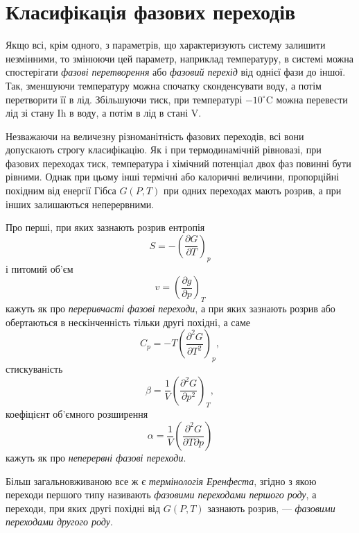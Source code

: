 \section{Класифікація фазових переходів}


Якщо всі, крім одного, з параметрів, що характеризують систему залишити незмінними, то
змінюючи цей параметр, наприклад температуру, в системі можна спостерігати \emph{фазові перетворення}
або \emph{фазовий перехід} від однієї фази до іншої. Так, зменшуючи температуру можна спочатку
сконденсувати воду, а потім перетворити її в лід. Збільшуючи тиск, при температурі $-10^\circ$C можна
перевести лід зі стану Ih в воду, а потім в лід в стані V.

Незважаючи на величезну різноманітність фазових переходів, всі вони допускають строгу класифікацію. Як
і при термодинамічній рівновазі, при фазових переходах тиск, температура і хімічний потенціал двох фаз
повинні бути рівними. Однак при цьому інші термічні або калоричні величини, пропорційні похідним від
енергії Гібса $G(P,T)$ при одних переходах мають розрив, а при інших залишаються неперервними.

Про перші, при яких зазнають розрив ентропія
\begin{equation}
S = -\left(\frac{\partial G}{\partial T}\right)_p
\end{equation}
і питомий об'єм
\begin{equation}
v = \left(\frac{\partial g}{\partial p}\right)_T
\end{equation}
кажуть як про \emph{переривчасті фазові переходи}, а при яких зазнають розрив або обертаються в
нескінченність тільки другі похідні, а саме
\begin{equation}
C_p = -T\left(\frac{\partial^2 G}{\partial T^2}\right)_p,
\end{equation}
стискуваність
\begin{equation}
\beta = \frac{1}{V}\left(\frac{\partial^2 G}{\partial p^2}\right)_T,
\end{equation}
коефіцієнт об'ємного розширення
\begin{equation}
\alpha = \frac{1}{V}\left(\frac{\partial^2 G}{\partial T \partial p}\right)
\end{equation}
кажуть як про \emph{неперервні фазові переходи}.

Більш загальновживаною все ж є \emph{термінологія Еренфеста}, згідно з якою переходи першого типу
називають \emph{фазовими переходами першого роду}, а переходи, при яких другі похідні від $G(P,T)$
зазнають розрив, --- \emph{фазовими переходами другого роду}.

